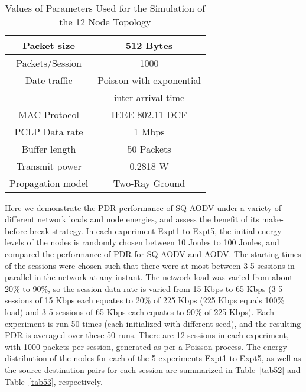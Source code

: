 \begin{table}[htbp]
\centering
  \caption{Values of Parameters Used for the Simulation of the 12 Node Topology}
  \hfill \\	
  \begin{tabular}{|c|c|}
  \hline
  Packet size & 512 Bytes \\
  \hline
  Packets/Session & 1000 \\
  \hline
  Date traffic & Poisson with exponential\\
  \            & inter-arrival time \\
  \hline
  MAC Protocol & IEEE 802.11 DCF \\
  \hline
  PCLP Data rate & 1 Mbps \\
  \hline
  Buffer length & 50 Packets \\
  \hline
  Transmit power & 0.2818 W \\
  \hline
  Propagation model & Two-Ray Ground \\
  \hline
  \end{tabular}
  \label{tab51}
\end{table}

Here we demonstrate the PDR performance of SQ-AODV under a variety of different network loads and node energies, and assess the benefit of its make-before-break strategy. In each experiment Expt1 to Expt5, the initial energy levels of the nodes is randomly chosen between 10 Joules to 100 Joules, and compared the performance of PDR for SQ-AODV and AODV. The starting times of the sessions were chosen such that there were at most between 3-5 sessions in parallel in the network at any instant. The network load was varied from about 20\% to 90\%, so the session data rate is varied from 15 Kbps to 65 Kbps (3-5 sessions of 15 Kbps each equates to 20\% of 225 Kbps (225 Kbps equals 100\% load) and 3-5 sessions of 65 Kbps each equates to 90\% of 225 Kbps). Each experiment is run 50 times (each initialized with different seed), and the resulting PDR is averaged over these 50 runs. There are 12 sessions in each experiment, with 1000 packets per session, generated as per a Poisson process. The energy distribution of the nodes for each of the 5 experiments Expt1 to Expt5, as well as the source-destination pairs for each session are summarized in Table~\ref{tab52} and Table~\ref{tab53}, respectively.

